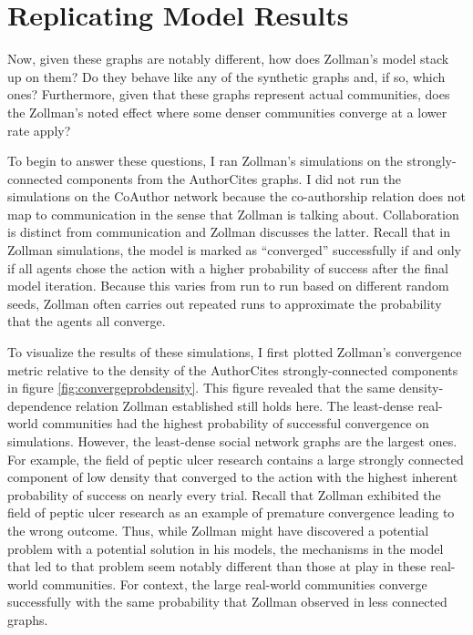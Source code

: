 \hypertarget{replicating-model-results}{%
\section{Replicating Model Results}\label{replicating-model-results}}

Now, given these graphs are notably different, how does Zollman's model
stack up on them? Do they behave like any of the synthetic graphs and,
if so, which ones? Furthermore, given that these graphs represent actual
communities, does the Zollman's noted effect where some denser
communities converge at a lower rate apply?

To begin to answer these questions, I ran Zollman's simulations on the
strongly-connected components from the AuthorCites graphs. I did not run
the simulations on the CoAuthor network because the co-authorship
relation does not map to communication in the sense that Zollman is
talking about. Collaboration is distinct from communication and Zollman
discusses the latter. Recall that in Zollman simulations, the model is
marked as ``converged'' successfully if and only if all agents chose the
action with a higher probability of success after the final model
iteration. Because this varies from run to run based on different random
seeds, Zollman often carries out repeated runs to approximate the
probability that the agents all converge.

To visualize the results of these simulations, I first plotted Zollman's
convergence metric relative to the density of the AuthorCites
strongly-connected components in figure \ref{fig:convergeprobdensity}.
This figure revealed that the same density-dependence relation Zollman
established still holds here. The least-dense real-world communities had
the highest probability of successful convergence on simulations.
However, the least-dense social network graphs are the largest ones. For
example, the field of peptic ulcer research contains a large strongly
connected component of low density that converged to the action with the
highest inherent probability of success on nearly every trial. Recall
that Zollman exhibited the field of peptic ulcer research as an example
of premature convergence leading to the wrong outcome. Thus, while
Zollman might have discovered a potential problem with a potential
solution in his models, the mechanisms in the model that led to that
problem seem notably different than those at play in these real-world
communities. For context, the large real-world communities converge
successfully with the same probability that Zollman observed in less
connected graphs.

